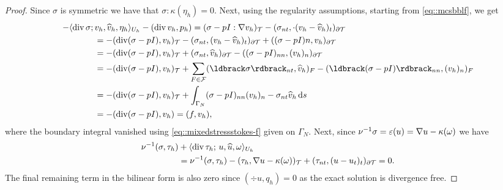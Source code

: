 \begin{proof}
  Since $\sigma$ is symmetric we have that $\sigma :
  \kappa(\eta_h)=0$. Next, using the regularity assumptions,
  starting from \eqref{eq::mcsbblf}, we get 
\begin{align*}
  -\langle\div\sigma;\,
  &v_h, \hat{v}_h, \eta_h\rangle_{U_h} - (\div v_h, p_h)
    = (\sigma - pI :\nabla v_h)_\mesh - (\sigma_{nt} ,\cdot (v_h-\hat{v}_h)_t)_{\partial\mesh}\\
  & = -(\div(\sigma- pI),  v_h)_\mesh - (\sigma_{nt},  (v_h-\hat{v}_h)_t)_{\partial\mesh} +((\sigma - pI)n, v_h )_{\partial\mesh}\\
  & = -(\div(\sigma- pI),  v_h)_\mesh
    + (\sigma_{nt},  \hat{v}_h)_{\partial \mesh}
    - ((\sigma - pI)_{nn},  (v_h)_n)_{\partial \mesh}
  \\
  & = -(\div(\sigma- pI),  v_h)_\mesh
    + \sum_{F\in\facets} (\jump{\sigma}_{nt},  \hat{v}_h)_F
    - (\jump{(\sigma - pI)}_{nn},  (v_h)_n)_F
    \\
  & = -(\div(\sigma- pI),  v_h)_\mesh
    + \int_{\Gamma_N}(\sigma - pI)_{nn} (v_h)_n - \sigma_{nt} \hat{v}_h \ds\\
  & = -(\div(\sigma- pI),  v_h)
     = (f, v_h),
\end{align*}
where the boundary integral vanished using
\eqref{eq::mixedstressstokes-f} given on $\Gamma_N$.
Next, since
$\nu^{-1}\sigma=\varepsilon(u)=\nabla u - \kappa(\omega)$ we have
\begin{align*}
  \nu^{-1} (\sigma, \tau_h)
  &+ \langle\operatorname{div}\tau_h; \,u, \widehat{u}, \omega \rangle_{U_h} \\
  & =  \nu^{-1} (\sigma, \tau_h) -(\tau_h, \nabla u -\kappa(\omega))_{\mathcal{T}}
    + (\tau_{nt}, (u - u_t)_t)_{\partial \mathcal{T}} = 0.    
\end{align*}
The final remaining term in the bilinear form is also zero
since $(\div u, q_h) = 0$ as the exact solution is divergence free.
\qqed
\end{proof}

